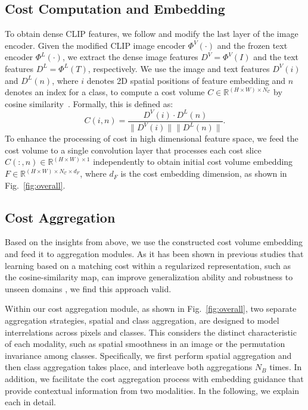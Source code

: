 \documentclass[10pt,twocolumn,letterpaper]{article}
\begin{document}
\subsection{Cost Computation and Embedding}
To obtain dense CLIP features, we follow \cite{zhou2022extract} and modify the last layer of the image encoder.
Given the modified CLIP image encoder $\Phi^V(\cdot)$ and the frozen text encoder $\Phi^L(\cdot)$, we extract the dense image features $D^V = \Phi^V(I)$ and the text features $D^L = \Phi^L(T)$, respectively. We use the image and text features $D^V(i)$ and $D^L(n)$, where $i$ denotes 2D spatial positions of feature embedding and $n$ denotes an index for a class, to compute a cost volume $C\in\mathbb{R}^{(H\times W)\times N_\mathcal{C}}$ by cosine similarity~\cite{rocco2017convolutional}. 
Formally, this is defined as:
\begin{equation}
  {C}(i,n)=
    \frac{D^V(i)\cdot D^L(n)}{\|D^V(i)\|\|D^L(n)\|}.
\end{equation}
To enhance the processing of cost in high dimensional feature space, we feed the cost volume to a single convolution layer that processes each cost slice $C(:, n)\in \mathbb{R}^{(H\times W)\times 1}$ independently to obtain initial cost volume embedding $F\in \mathbb{R}^{(H\times W)\times N_\mathcal{C} \times d_F}$, where $d_F$ is the cost embedding dimension, as shown in Fig.~\ref{fig:overall}. 

\subsection{Cost Aggregation}
Based on the insights from above, we use the constructed cost volume embedding and feed it to aggregation modules. 
As it has been shown in previous studies that learning based on a matching cost within a regularized representation, such as the cosine-similarity map, can improve generalization ability and robustness to unseen domains \cite{cai2020matching,song2021adastereo,liu2022graftnet}, we find this approach valid. 

Within our cost aggregation module, as shown in Fig.~\ref{fig:overall}, two separate aggregation strategies, \ie spatial and class aggregation, are designed to model interrelations across pixels and classes. This considers the distinct characteristic of each modality, such as spatial smoothness in an image or the permutation invariance among classes. Specifically, we first perform spatial aggregation and then class aggregation takes place, and interleave both aggregations $N_B$ times. In addition, we facilitate the cost aggregation process with embedding guidance that provide contextual information from two modalities. In the following, we explain each in detail.
\vspace{-10pt}
\end{document}
